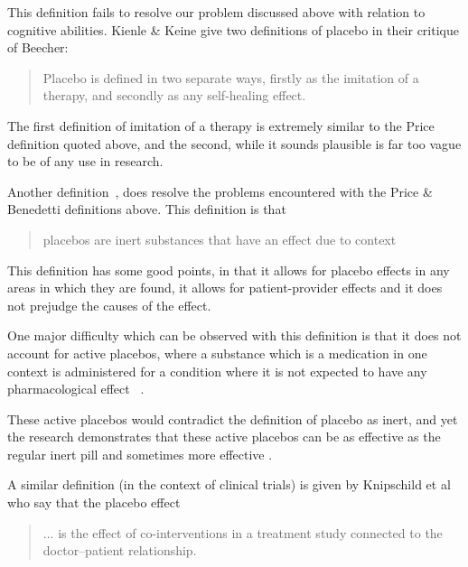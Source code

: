 This definition fails to resolve our problem discussed above with relation to cognitive abilities. 
Kienle \& Keine give two definitions of placebo in their critique of Beecher:

\begin{quotation}
Placebo is defined in two separate ways, firstly as the imitation of a
therapy, and secondly as any self-healing effect. 
\end{quotation}

The first definition of imitation of a therapy is extremely similar to the Price definition quoted above, and the second, while it sounds plausible is far too vague to be of any use in research.

Another definition~\cite{DiBlasi2001}, does resolve the problems encountered with the Price \& Benedetti  definitions above. This definition is that

\begin{quotation}
  placebos are inert substances that have an effect due to context
\end{quotation}

This definition has some good points, in that it allows for placebo effects in any areas in which they are found, it allows for patient-provider effects and it does not prejudge the causes of the effect. 

One major difficulty which can be observed with this definition is that it does not account for active placebos, where a substance which is a medication in one context is administered for a condition where it is not expected to have any pharmacological effect~\cite{Kirsch1998} . 

These active placebos would contradict the definition of placebo as inert, and yet the research demonstrates that these active placebos can be as effective as the regular inert pill \cite{Flaten2004} and sometimes more effective \cite{Kirsch2002a}. 


A similar definition (in the context of clinical trials) is given by Knipschild et al \cite{Knipschild2005} who say that the placebo effect

\begin{quotation}
... is the effect of co-interventions in a
treatment study connected to the doctor--patient relationship.
\end{quotation}

